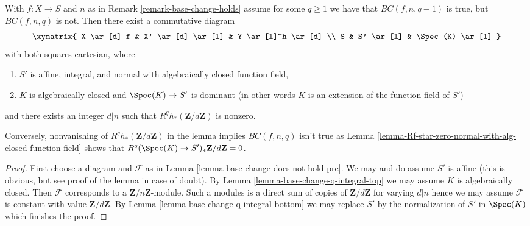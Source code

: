 \begin{lemma}
\label{lemma-base-change-does-not-hold}
With $f : X \to S$ and $n$ as in Remark \ref{remark-base-change-holds}
assume for some $q \geq 1$ we have that
$BC(f, n, q - 1)$ is true, but $BC(f, n, q)$ is not.
Then there exist a commutative diagram
$$
\xymatrix{
X \ar[d]_f & X' \ar[d] \ar[l] & Y \ar[l]^h \ar[d] \\
S & S' \ar[l] & \Spec(K) \ar[l]
}
$$
with both squares cartesian, where
\begin{enumerate}
\item $S'$ is affine, integral, and normal with algebraically
closed function field,
\item $K$ is algebraically closed and $\Spec(K) \to S'$
is dominant (in other words $K$ is an extension of
the function field of $S'$)
\end{enumerate}
and there exists an integer $d | n$
such that $R^qh_*(\mathbf{Z}/d\mathbf{Z})$ is nonzero.
\end{lemma}

\noindent
Conversely, nonvanishing of $R^qh_*(\mathbf{Z}/d\mathbf{Z})$
in the lemma implies $BC(f, n, q)$ isn't true as
Lemma \ref{lemma-Rf-star-zero-normal-with-alg-closed-function-field}
shows that $R^q(\Spec(K) \to S')_*\mathbf{Z}/d\mathbf{Z} = 0$.

\begin{proof}
First choose a diagram and $\mathcal{F}$ as in
Lemma \ref{lemma-base-change-does-not-hold-pre}.
We may and do assume $S'$ is affine (this is obvious, but
see proof of the lemma in case of doubt).
By Lemma \ref{lemma-base-change-q-integral-top}
we may assume $K$ is algebraically closed.
Then $\mathcal{F}$ corresponds to a $\mathbf{Z}/n\mathbf{Z}$-module.
Such a modules is a direct sum of copies of $\mathbf{Z}/d\mathbf{Z}$
for varying $d | n$ hence we may assume $\mathcal{F}$ is
constant with value $\mathbf{Z}/d\mathbf{Z}$.
By Lemma \ref{lemma-base-change-q-integral-bottom}
we may replace $S'$ by the normalization
of $S'$ in $\Spec(K)$ which finishes the proof.
\end{proof}




